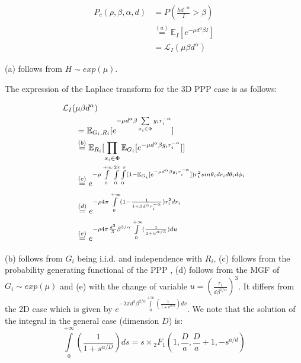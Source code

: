 \documentclass{sig-alternate-05-2015}
\begin{document}
\begin{align}
 P_c(\rho,\beta,\alpha,d) & = P\left(\frac{hd^{-\alpha}}{I}>\beta\right) \nonumber\\
& \stackrel{(a)}{=} \mathbb{E}_{I}[e^{-\mu d^{\alpha}\beta I}] \nonumber\\
 & = \mathcal{L}_I(\mu \beta d^{\alpha})
\end{align}

(a) follows from $H\sim exp(\mu)$.

The expression of the Laplace transform for the 3D PPP case is as follows:

\begin{align}
 \label{laplaceeq}
&\mathcal{L}_I(\mu \beta d^{\alpha}) \nonumber\\
 & \hphantom{aaa} = \mathbb{E}_{G_i,R_i}[e^{-\mu d^{\alpha}\beta \sum \limits_{x_i \in \Phi} g_ir_i^{-\alpha} }] \nonumber\\
 & \hphantom{aaa}\stackrel{(b)}{=} \mathbb{E}_{R_i}[\prod \limits_{x_i \in \Phi} \mathbb{E}_{G_i}[e^{-\mu d^{\alpha}\beta g_i r_i^{-\alpha} }]]  \nonumber\\
 & \hphantom{aaa}\stackrel{(c)}{=} e^{-\rho \int \limits_{0}^{+\infty} \int \limits_{0}^{2\pi} \int \limits_{0}^{\pi} (1-\mathbb{E}_{G_i}[e^{-\mu d^{\alpha}\beta g_i r_i^{-\alpha} }])r_i^2sin\theta_i dr_i d\theta_i d\phi_i} \nonumber\\
 & \hphantom{aaa}\stackrel{(d)}{=} e^{-\rho 4 \pi \int \limits_{0}^{+\infty}(1-\frac{1}{1+\beta d^{\alpha} r_i^{-\alpha}})r_i^2 dr_i} \nonumber\\
 & \hphantom{aaa}\stackrel{(e)}{=} e^{-\rho 4 \pi \frac{d^3}{3} \beta^{3/\alpha} \int \limits_{0}^{+\infty}(\frac{1}{1+u^{\alpha/3}})du}
 \phantom{\hspace{2cm}}
\end{align}

(b) follows from $G_i$ being i.i.d. and independence with $R_i$, (c) follows from the probability generating functional of the PPP \cite{stoyan87}, (d) follows from the MGF of $G_i \sim exp(\mu)$ and (e) with the change of variable $u=\left(\frac{r_i}{d\beta^{1/\alpha}} \right)^3$. It differs from the 2D case which is given by $ e^{-\lambda \pi d^2 \beta^{2/\alpha} \int \limits_{0}^{+\infty}(\frac{1}{1+v^{\alpha/2}})dv}$. We note that the solution of the integral in the general case (dimension $D$) is:
\begin{equation}
  \int \limits_{0}^{+\infty}(\frac{1}{1+s^{\alpha/D}})ds=s\times {}_2F_1(1,\frac{D}{a},\frac{D}{a}+1,-s^{a/d})
\end{equation}
\end{document}

